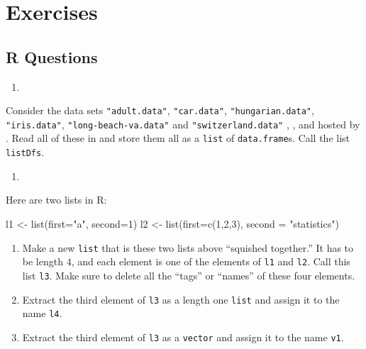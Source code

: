 \documentclass[
  12pt,
  krantz2]{krantz}
\makeatletter
\newenvironment{Shaded}{\begin{snugshade}}{\end{snugshade}}
\newcommand{\AttributeTok}[1]{\textcolor[rgb]{0.61,0.61,0.61}{#1}}
\newcommand{\DecValTok}[1]{\textcolor[rgb]{0.06,0.06,0.06}{#1}}
\newcommand{\FunctionTok}[1]{\textcolor[rgb]{0,0,0}{#1}}
\newcommand{\NormalTok}[1]{#1}
\newcommand{\OtherTok}[1]{\textcolor[rgb]{0.37,0.37,0.37}{#1}}
\newcommand{\StringTok}[1]{\textcolor[rgb]{0.5,0.5,0.5}{#1}}
\providecommand{\tightlist}{%
  \setlength{\itemsep}{0pt}\setlength{\parskip}{0pt}}
\newenvironment{kframe}{%
\medskip{}
\setlength{\fboxsep}{.8em}
 \def\at@end@of@kframe{}%
 \ifinner\ifhmode%
  \def\at@end@of@kframe{\end{minipage}}%
  \begin{minipage}{\columnwidth}%
 \fi\fi%
 \def\FrameCommand##1{\hskip\@totalleftmargin \hskip-\fboxsep
 \colorbox{shadecolor}{##1}\hskip-\fboxsep
     \hskip-\linewidth \hskip-\@totalleftmargin \hskip\columnwidth}%
 \MakeFramed {\advance\hsize-\width
   \@totalleftmargin\z@ \linewidth\hsize
   \@setminipage}}%
 {\par\unskip\endMakeFramed%
 \at@end@of@kframe}
\renewenvironment{Shaded}{\begin{kframe}}{\end{kframe}}
\makeatother
\begin{document}
\hypertarget{exercises-3}{%
\section{Exercises}\label{exercises-3}}

\hypertarget{r-questions-3}{%
\subsection{R Questions}\label{r-questions-3}}

\begin{enumerate}
\def\labelenumi{\arabic{enumi}.}
\tightlist
\item
\end{enumerate}

Consider the data sets \texttt{"adult.data"}, \texttt{"car.data"}, \texttt{"hungarian.data"}, \texttt{"iris.data"}, \texttt{"long-beach-va.data"} and \texttt{"switzerland.data"} \citep{misc_heart_disease_45}, \citep{misc_iris_53}, \citep{misc_adult_2} and \citep{misc_car_evaluation_19} hosted by \citep{uci_data}. Read all of these in and store them all as a \texttt{list} of \texttt{data.frame}s. Call the list \texttt{listDfs}.

\begin{enumerate}
\def\labelenumi{\arabic{enumi}.}
\setcounter{enumi}{1}
\tightlist
\item
\end{enumerate}

Here are two lists in R:

\begin{Shaded}
\begin{Highlighting}[]
\NormalTok{l1 }\OtherTok{\textless{}{-}} \FunctionTok{list}\NormalTok{(}\AttributeTok{first=}\StringTok{"a"}\NormalTok{, }\AttributeTok{second=}\DecValTok{1}\NormalTok{)}
\NormalTok{l2 }\OtherTok{\textless{}{-}} \FunctionTok{list}\NormalTok{(}\AttributeTok{first=}\FunctionTok{c}\NormalTok{(}\DecValTok{1}\NormalTok{,}\DecValTok{2}\NormalTok{,}\DecValTok{3}\NormalTok{), }\AttributeTok{second =} \StringTok{"statistics"}\NormalTok{)}
\end{Highlighting}
\end{Shaded}

\begin{enumerate}
\def\labelenumi{\alph{enumi})}
\item
  Make a new \texttt{list} that is these two lists above ``squished together.'' It has to be length \(4\), and each element is one of the elements of \texttt{l1} and \texttt{l2}. Call this list \texttt{l3}. Make sure to delete all the ``tags'' or ``names'' of these four elements.
\item
  Extract the third element of \texttt{l3} as a length one \texttt{list} and assign it to the name \texttt{l4}.
\item
  Extract the third element of \texttt{l3} as a \texttt{vector} and assign it to the name \texttt{v1}.
\end{enumerate}
\end{document}
